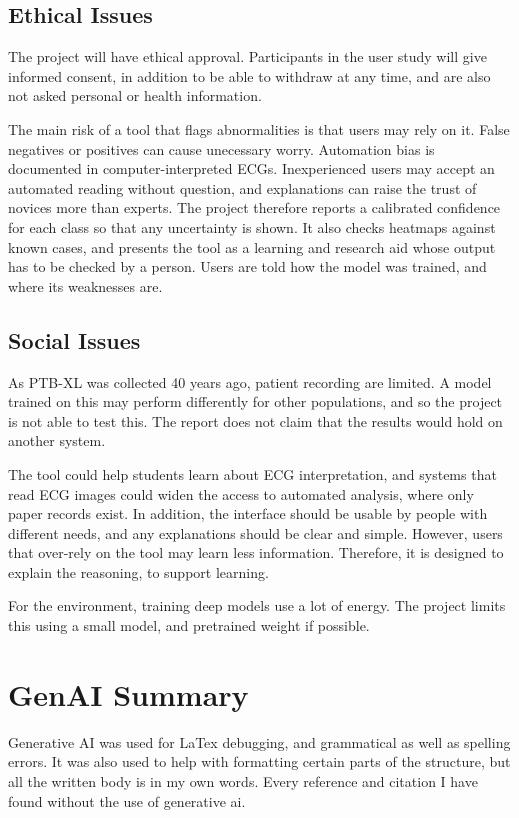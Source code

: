 \subsection{Ethical Issues}
The project will have ethical approval. Participants in the user study will give informed consent, in addition to be able to withdraw at any time, and are also not asked personal or health information.

The main risk of a tool that flags abnormalities is that users may rely on it. False negatives or positives can cause unecessary worry. Automation bias is documented in computer-interpreted ECGs. Inexperienced
users may accept an automated reading without question,
and explanations can raise the trust of novices more than experts. The project therefore reports a calibrated confidence for each
class so that any uncertainty is shown. It also checks heatmaps against known cases, and presents the
tool as a learning and research aid whose output has to be checked by a person.
Users are told how the model was trained, and where its weaknesses are.

\subsection{Social Issues}
As PTB-XL was collected 40 years ago, patient recording are limited. A model trained on this may perform differently for other populations, and so the project is not able to test this. The report does not claim that the results would hold on another system.

The tool could help students learn about ECG interpretation, and systems that read ECG images could widen the access to automated analysis, where only paper records exist. In addition, the interface should be usable by people with different needs, and any explanations should be clear and simple. However, users that over-rely on the tool may learn less information. Therefore, it is designed to explain the reasoning, to support learning.

For the environment, training deep models use a lot of energy. The project limits this using a small model, and pretrained weight if possible.
\section{GenAI Summary}
\label{app: genai}
Generative AI was used for LaTex debugging, and grammatical as well as spelling errors. It was also used to help with formatting certain parts of the structure, but all the written body is in my own words. Every reference and citation I have found without the use of generative ai.

